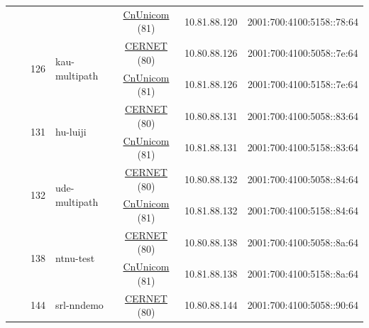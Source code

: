 \begin{small}
\begin{center}
\begin{longtable}{|c|c|c|c|c|c|c|c|}
  &  &  &  & \multicolumn{2}{|c|}{\tiny{\href{http://www.chinaunicom.com}{CnUnicom} (81)}} & \tiny{10.81.88.120} & \tiny{2001:700:4100:5158::78:64} \\* \cline{3-3}\cline{4-4}\cline{5-5}\cline{6-6}\cline{7-7}\cline{8-8}
  &  & \multirow{2}{*}{\tiny{126}} & \multicolumn{1}{|l|}{\multirow{2}{*}{\tiny{kau-multipath}}} & \multicolumn{2}{|c|}{\tiny{\href{http://www.cernet.edu.cn}{CERNET} (80)}} & \tiny{10.80.88.126} & \tiny{2001:700:4100:5058::7e:64} \\* \cline{5-5}\cline{6-6}\cline{7-7}\cline{8-8}
  &  &  &  & \multicolumn{2}{|c|}{\tiny{\href{http://www.chinaunicom.com}{CnUnicom} (81)}} & \tiny{10.81.88.126} & \tiny{2001:700:4100:5158::7e:64} \\* \cline{3-3}\cline{4-4}\cline{5-5}\cline{6-6}\cline{7-7}\cline{8-8}
  &  & \multirow{2}{*}{\tiny{131}} & \multicolumn{1}{|l|}{\multirow{2}{*}{\tiny{hu-luiji}}} & \multicolumn{2}{|c|}{\tiny{\href{http://www.cernet.edu.cn}{CERNET} (80)}} & \tiny{10.80.88.131} & \tiny{2001:700:4100:5058::83:64} \\* \cline{5-5}\cline{6-6}\cline{7-7}\cline{8-8}
  &  &  &  & \multicolumn{2}{|c|}{\tiny{\href{http://www.chinaunicom.com}{CnUnicom} (81)}} & \tiny{10.81.88.131} & \tiny{2001:700:4100:5158::83:64} \\* \cline{3-3}\cline{4-4}\cline{5-5}\cline{6-6}\cline{7-7}\cline{8-8}
  &  & \multirow{2}{*}{\tiny{132}} & \multicolumn{1}{|l|}{\multirow{2}{*}{\tiny{ude-multipath}}} & \multicolumn{2}{|c|}{\tiny{\href{http://www.cernet.edu.cn}{CERNET} (80)}} & \tiny{10.80.88.132} & \tiny{2001:700:4100:5058::84:64} \\* \cline{5-5}\cline{6-6}\cline{7-7}\cline{8-8}
  &  &  &  & \multicolumn{2}{|c|}{\tiny{\href{http://www.chinaunicom.com}{CnUnicom} (81)}} & \tiny{10.81.88.132} & \tiny{2001:700:4100:5158::84:64} \\* \cline{3-3}\cline{4-4}\cline{5-5}\cline{6-6}\cline{7-7}\cline{8-8}
  &  & \multirow{2}{*}{\tiny{138}} & \multicolumn{1}{|l|}{\multirow{2}{*}{\tiny{ntnu-test}}} & \multicolumn{2}{|c|}{\tiny{\href{http://www.cernet.edu.cn}{CERNET} (80)}} & \tiny{10.80.88.138} & \tiny{2001:700:4100:5058::8a:64} \\* \cline{5-5}\cline{6-6}\cline{7-7}\cline{8-8}
  &  &  &  & \multicolumn{2}{|c|}{\tiny{\href{http://www.chinaunicom.com}{CnUnicom} (81)}} & \tiny{10.81.88.138} & \tiny{2001:700:4100:5158::8a:64} \\* \cline{3-3}\cline{4-4}\cline{5-5}\cline{6-6}\cline{7-7}\cline{8-8}
  &  & \multirow{2}{*}{\tiny{144}} & \multicolumn{1}{|l|}{\multirow{2}{*}{\tiny{srl-nndemo}}} & \multicolumn{2}{|c|}{\tiny{\href{http://www.cernet.edu.cn}{CERNET} (80)}} & \tiny{10.80.88.144} & \tiny{2001:700:4100:5058::90:64} \\* \cline{5-5}\cline{6-6}\cline{7-7}\cline{8-8}

\end{longtable}
\end{center}
\end{small}
